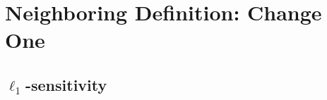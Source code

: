 \documentclass[11pt]{scrartcl} %
\begin{document}
\section{Neighboring Definition: Change One}
\subsection{$\ell_1$-sensitivity}
%
%
%
%
%
\end{document}
